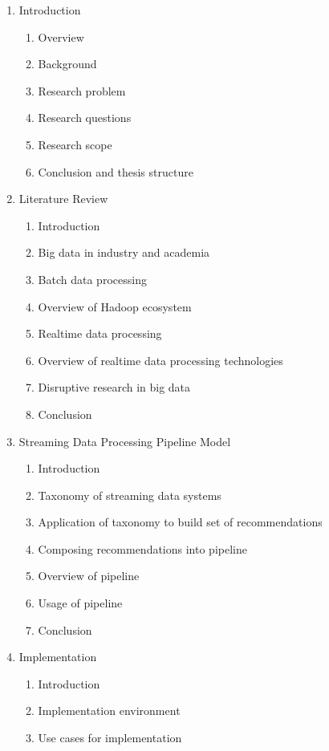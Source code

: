 \documentclass[a4paper,11pt]{article}
\begin{document}
\begin{enumerate}
  \item Introduction
  \begin{enumerate}[label*=\arabic*.]
    \item Overview
    \item Background
    \item Research problem
    \item Research questions
    \item Research scope
    \item Conclusion and thesis structure
  \end{enumerate}
  \item Literature Review
  \begin{enumerate}[label*=\arabic*.]
    \item Introduction
    \item Big data in industry and academia
    \item Batch data processing
    \item Overview of Hadoop ecosystem
    \item Realtime data processing
    \item Overview of realtime data processing technologies
    \item Disruptive research in big data
    \item Conclusion
  \end{enumerate}
  \item Streaming Data Processing Pipeline Model
  \begin{enumerate}[label*=\arabic*.]
    \item Introduction
    \item Taxonomy of streaming data systems
    \item Application of taxonomy to build set of recommendations
    \item Composing recommendations into pipeline
    \item Overview of pipeline
    \item Usage of pipeline
    \item Conclusion
  \end{enumerate}
  \item Implementation
  \begin{enumerate}[label*=\arabic*.]
    \item Introduction
    \item Implementation environment
    \item Use cases for implementation

\end{enumerate}
\end{enumerate}
\end{document}
